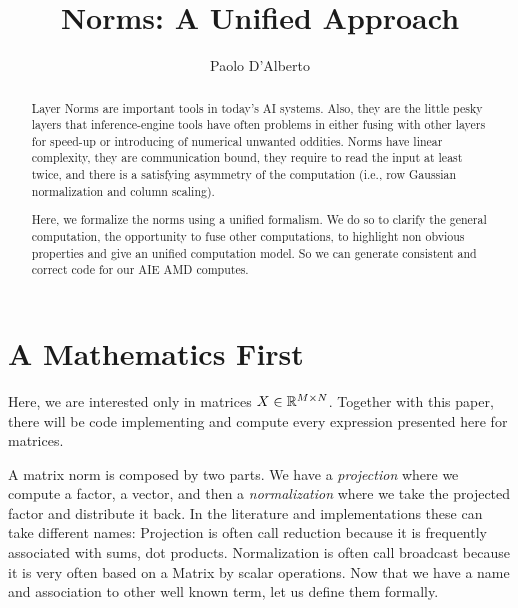 \documentclass[acmsmall]{acmart}
\begin{document}
\title{Norms: A Unified Approach}

\author{Paolo D'Alberto}
\email{}

\renewcommand{\shortauthors}{D'Alberto et al.}

\begin{abstract}

  Layer Norms are important tools in today's AI systems.  Also, they
  are the little pesky layers that inference-engine tools have often
  problems in either fusing with other layers for speed-up or
  introducing of numerical unwanted oddities.  Norms have linear
  complexity, they are communication bound, they require to read the
  input at least twice, and there is a satisfying asymmetry of the
  computation (i.e., row Gaussian normalization and column scaling).
  
  Here, we formalize the norms using a unified formalism. We do so to
  clarify the general computation, the opportunity to fuse other
  computations, to highlight non obvious properties and give an
  unified computation model. So we can generate consistent and correct
  code for our AIE AMD computes.
  
\end{abstract}

\maketitle

\section{A Mathematics First} 
\label{sec:introduction}
Here, we are interested only in matrices $X \in \mathbb{R}^{M \times
  N}$. Together with this paper, there will be code implementing and
compute every expression presented here for matrices.

A matrix norm is composed by two parts. We have a {\em projection}
where we compute a factor, a vector, and then a {\em normalization}
where we take the projected factor and distribute it back. In the
literature and implementations these can take different names:
Projection is often call reduction because it is frequently associated
with sums, dot products. Normalization is often call broadcast because
it is very often based on a Matrix by scalar operations. Now that we
have a name and association to other well known term, let us define
them formally.
\end{document}

